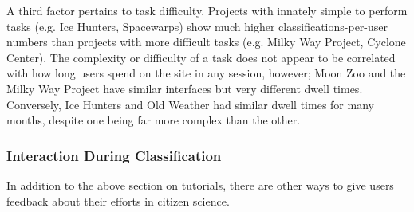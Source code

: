 \documentclass{sigchi}
\begin{document}

A third factor pertains to task difficulty. Projects with innately simple to perform tasks (e.g. Ice Hunters, Spacewarps) show much higher classifications-per-user numbers than projects with more difficult tasks (e.g. Milky Way Project, Cyclone Center). The complexity or difficulty of a task does not appear to be correlated with how long users spend on the site in any session, however; Moon Zoo and the Milky Way Project have similar interfaces but very different dwell times. Conversely, Ice Hunters and Old Weather had similar dwell times for many months, despite one being far more complex than the other.





\subsubsection{Interaction During Classification}
In addition to the above section on tutorials, there are other ways to give users feedback about their efforts in citizen science.
\end{document}
